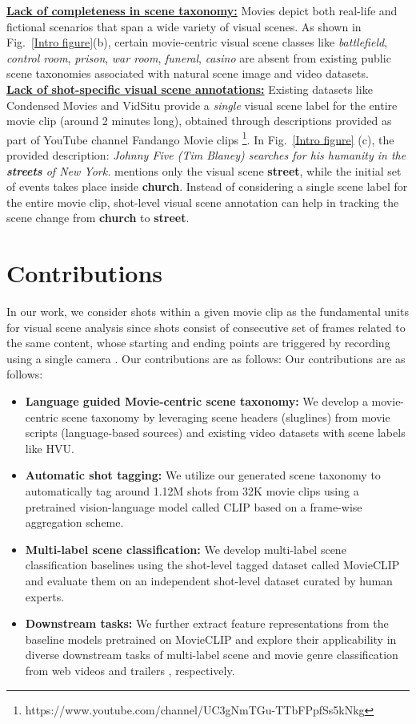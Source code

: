 \textbf{\underline{Lack of completeness in scene taxonomy:}} Movies depict both real-life and fictional scenarios that span a wide variety of visual scenes. As shown in Fig.~\ref{Intro figure}(b), certain movie-centric visual scene classes like \textit{battlefield}, \textit{control room}, \textit{prison}, \textit{war room}, \textit{funeral}, \textit{casino} are absent from existing public scene taxonomies associated with natural scene image and video datasets.\\
\textbf{\underline{Lack of shot-specific visual scene annotations:}} Existing datasets like Condensed Movies \cite{bain2020condensed} and VidSitu \cite{Sadhu_2021_CVPR} provide a {\em single} visual scene label for the entire movie clip (around 2 minutes long), obtained through descriptions provided as part of YouTube channel Fandango Movie clips \footnote{https://www.youtube.com/channel/UC3gNmTGu-TTbFPpfSs5kNkg}. In Fig.~\ref{Intro figure} (c), the provided description: \textit{Johnny Five (Tim Blaney) searches for his humanity in the \textbf{streets} of New York.} mentions only the visual scene \textbf{street}, while the initial set of events takes place inside \textbf{church}. Instead of considering a single scene label for the entire movie clip, shot-level visual scene annotation can help in tracking the scene change from \textbf{church} to \textbf{street}.
\section{Contributions}
In our work, we consider shots within a given movie clip as the fundamental units for visual scene analysis since shots consist of consecutive set of frames related to the same content, whose starting and ending points are triggered by recording using a single camera \cite{SBD}. Our contributions are as follows:
Our contributions are as follows:
\begin{itemize}
\item \textbf{Language guided Movie-centric scene taxonomy:} We develop a movie-centric scene taxonomy by leveraging scene headers (sluglines) from movie scripts (language-based sources) and existing video datasets with scene labels like HVU\cite{diba_large_2020}. 
\item \textbf{Automatic shot tagging:} We utilize our generated scene taxonomy to automatically tag around 1.12M shots from 32K movie clips using a pretrained vision-language model called CLIP \cite{CLIP} based on a frame-wise aggregation scheme.  
\item \textbf{Multi-label scene classification:} We develop multi-label scene classification baselines using the shot-level tagged dataset called MovieCLIP and evaluate them on an independent shot-level dataset curated by human experts. 
\item \textbf{Downstream tasks:} We further extract feature representations from the baseline models pretrained on MovieCLIP and explore their applicability in diverse downstream tasks of multi-label scene and movie genre classification from web videos \cite{diba_large_2020} and trailers \cite{2019Moviescope}, respectively. 
\end{itemize}
